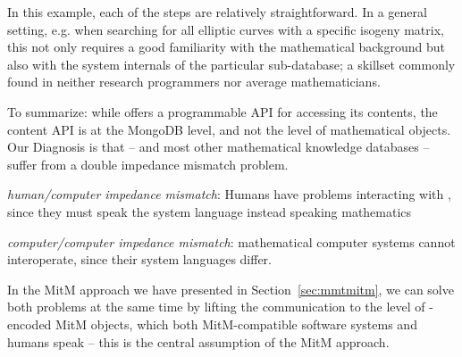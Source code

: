 In this example, each of the steps are relatively straightforward. 
In a general setting, e.g. when searching for all elliptic curves with a specific isogeny matrix, this not only requires a good familiarity with the mathematical background but also with the system internals of the particular \lmfdb sub-database; a skillset commonly found in neither research programmers nor average mathematicians.   

To summarize: while \lmfdb offers a programmable API for accessing its contents, the content API is at the MongoDB level, and not the level of mathematical objects. 
Our Diagnosis is that \lmfdb -- and most other mathematical knowledge databases -- suffer from a double impedance mismatch problem.
\begin{compactenum}[\bf {I}1]
\item \emph{human/computer impedance mismatch}: Humans have problems interacting with \lmfdb, since they must speak the system language instead \lmfdb speaking mathematics
\item \emph{computer/computer impedance mismatch}: mathematical computer systems cannot interoperate, since their system languages differ.
\end{compactenum}
In the MitM approach we have presented in Section~\ref{sec:mmtmitm}, we can solve both problems at the same time by lifting the communication to the level of \ommt-encoded MitM objects, which both MitM-compatible software systems and humans speak -- this is the central assumption of the MitM approach.

